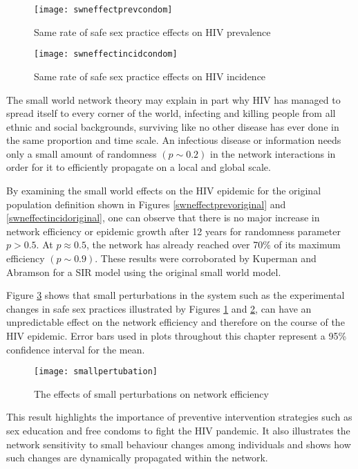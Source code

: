\begin{figure}[ht]
\texttt{[image: swneffectprevcondom]}
\caption{Same rate of safe sex practice effects on HIV prevalence}
\label{swneffectprevcondom}
\end{figure}
\begin{figure}[ht]
\texttt{[image: swneffectincidcondom]}
\caption{Same rate of safe sex practice effects on HIV incidence}
\label{swneffectincidcondom}
\end{figure}
\clearpage

The small world network theory may explain in part why HIV has managed to spread itself
to every corner of the world, infecting and killing people from all ethnic and social
backgrounds, surviving like no other disease has ever done in the same proportion and
time scale. An infectious disease or information needs only a small amount of randomness
$(p \sim 0.2)$ in the network interactions in order for it to efficiently propagate on a
local and global scale.

By examining the small world effects on the HIV epidemic for the original population
definition shown in Figures \ref{swneffectprevoriginal} and \ref{swneffectincidoriginal},
one can observe that there is no major increase in network efficiency or epidemic growth
after 12 years for randomness parameter $p > 0.5$. At $p \approx 0.5$, the network has
already reached over 70\% of its maximum efficiency $(p \sim 0.9)$. These results were
corroborated by Kuperman and Abramson \cite{Kuperman2001} for a SIR model using the
original small world model.

Figure \ref{smallpertubation} shows that small perturbations in the system such as the
experimental changes in safe sex practices illustrated by Figures
\ref{swneffectprevcondom} and \ref{swneffectincidcondom}, can have an unpredictable
effect on the network efficiency and therefore on the course of the HIV epidemic. Error
bars used in plots throughout this chapter represent a 95\% confidence interval for the
mean.
\begin{figure}[h]
\texttt{[image: smallpertubation]}
\caption{The effects of small perturbations on network efficiency}
\label{smallpertubation}
\end{figure}
\clearpage

This result highlights the importance of preventive intervention strategies such as sex
education and free condoms to fight the HIV pandemic. It also illustrates the network
sensitivity to small behaviour changes among individuals and shows how such changes are
dynamically propagated within the network.

